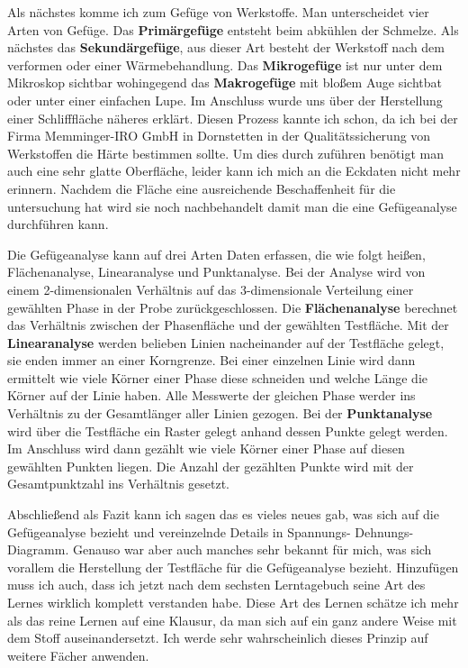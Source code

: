 \documentclass[12pt]{scrreprt}
\begin{document}
Als nächstes komme ich zum Gefüge von Werkstoffe. Man unterscheidet vier Arten von Gefüge. Das \textbf{Primärgefüge} entsteht beim abkühlen der Schmelze. Als nächstes das \textbf{Sekundärgefüge}, aus dieser Art besteht der Werkstoff nach dem verformen oder einer Wärmebehandlung. Das \textbf{Mikrogefüge} ist nur unter dem Mikroskop sichtbar wohingegend das \textbf{Makrogefüge} mit bloßem Auge sichtbat oder unter einer einfachen Lupe.
Im Anschluss wurde uns über der Herstellung einer Schlifffläche näheres erklärt. Diesen Prozess kannte ich schon, da ich bei der Firma Memminger-IRO GmbH in Dornstetten in der Qualitätssicherung von Werkstoffen die Härte bestimmen sollte. 
Um dies durch zuführen benötigt man auch eine sehr glatte Oberfläche, leider kann ich mich an die Eckdaten nicht mehr erinnern.  
Nachdem die Fläche eine ausreichende Beschaffenheit für die untersuchung hat wird sie noch nachbehandelt damit man die eine Gefügeanalyse durchführen kann.\par
\vspace{5pt}
Die Gefügeanalyse kann auf drei Arten Daten erfassen, die wie folgt heißen, Flächenanalyse, Linearanalyse und Punktanalyse. Bei der Analyse wird von einem 2-dimensionalen Verhältnis auf das 3-dimensionale Verteilung einer gewählten Phase in der Probe zurückgeschlossen.
Die \textbf{Flächenanalyse} berechnet das Verhältnis zwischen der Phasenfläche und der gewählten Testfläche. 
Mit der \textbf{Linearanalyse} werden belieben Linien nacheinander auf der Testfläche gelegt, sie enden immer an einer Korngrenze. Bei einer einzelnen Linie wird dann ermittelt wie viele Körner einer Phase diese schneiden und welche Länge die Körner auf der Linie haben. Alle Messwerte der gleichen Phase werder ins Verhältnis zu der Gesamtlänger aller Linien gezogen. 
Bei der \textbf{Punktanalyse} wird über die Testfläche ein Raster gelegt anhand dessen Punkte gelegt werden. Im Anschluss wird dann gezählt wie viele Körner einer Phase auf diesen gewählten Punkten liegen. Die Anzahl der gezählten Punkte wird mit der Gesamtpunktzahl ins Verhältnis gesetzt.\par
\vspace{5pt}
Abschließend als Fazit kann ich sagen das es vieles neues gab, was sich auf die Gefügeanalyse bezieht und vereinzelnde Details in Spannungs- Dehnungs-Diagramm. Genauso war aber auch manches sehr bekannt für mich, was sich vorallem die Herstellung der Testfläche für die Gefügeanalyse bezieht. 
Hinzufügen muss ich auch, dass ich jetzt nach dem sechsten Lerntagebuch seine Art des Lernes wirklich komplett verstanden habe. 
Diese Art des Lernen schätze ich mehr als das reine Lernen auf eine Klausur, da man sich auf ein ganz andere Weise mit dem Stoff auseinandersetzt. Ich werde sehr wahrscheinlich dieses Prinzip auf weitere Fächer anwenden.
\end{document}
